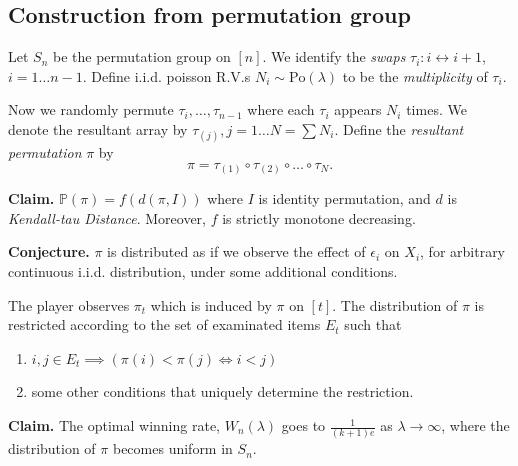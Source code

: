 \subsection{Construction from permutation group}


Let $S_n$ be the permutation group on $[n]$. We identify the \textit{swaps} $\tau_i: i \leftrightarrow i+1$, $i = 1\ldots n-1$. Define i.i.d. poisson R.V.s $N_i \sim \text{Po}(\lambda)$ to be the \textit{multiplicity} of $\tau_i$.

Now we randomly permute $\tau_i,\ldots, \tau_{n-1}$ where each $\tau_i$ appears $N_i$ times. We denote the resultant array by $\tau_{(j)}, j = 1\ldots N = \sum N_i$. Define the \textit{resultant permutation} $\pi$ by \[
\pi = \tau_{(1)} \circ \tau_{(2)} \circ \ldots \circ \tau_{N}
.\] 

\textbf{Claim.} $\mathbb{P}(\pi) = f(d(\pi, I))$ where $I$ is identity permutation, and $d$ is \textit{Kendall-tau Distance}. Moreover, $f$ is strictly monotone decreasing.

\textbf{Conjecture.} $\pi$ is distributed as if we observe the effect of $\epsilon_i$ on $X_i$, for arbitrary continuous i.i.d. distribution, under some additional conditions.

The player observes $\pi_t$ which is induced by $\pi$ on $[t]$. The distribution of $\pi$ is restricted according to the set of examinated items $E_t$ such that
\begin{enumerate}
	\item $i,j \in E_t \implies \left( \pi(i) < \pi(j) \iff i < j \right) $
	\item some other conditions that uniquely determine the restriction.
\end{enumerate}

\textbf{Claim.} The optimal winning rate, $W_n(\lambda)$ goes to  $\frac{1}{(k+1)e}$ as $\lambda \to \infty$, where the distribution of $\pi$ becomes uniform in $S_n$.
